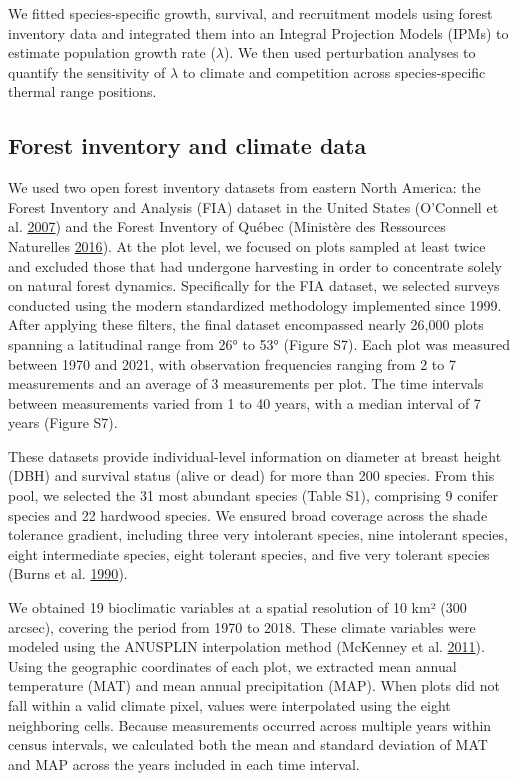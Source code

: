 \documentclass[12pt]{article}
\begin{document}
We fitted species-specific growth, survival, and recruitment models
using forest inventory data and integrated them into an Integral
Projection Models (IPMs) to estimate population growth rate
(\(\lambda\)). We then used perturbation analyses to quantify the
sensitivity of \(\lambda\) to climate and competition across
species-specific thermal range positions.

\hypertarget{forest-inventory-and-climate-data}{%
\subsection{Forest inventory and climate
data}\label{forest-inventory-and-climate-data}}

We used two open forest inventory datasets from eastern North America:
the Forest Inventory and Analysis (FIA) dataset in the United States
(O'Connell et al. \protect\hyperlink{ref-OConnell2007}{2007}) and the
Forest Inventory of Québec (Ministère des Ressources Naturelles
\protect\hyperlink{ref-Naturelles2016}{2016}). At the plot level, we
focused on plots sampled at least twice and excluded those that had
undergone harvesting in order to concentrate solely on natural forest
dynamics. Specifically for the FIA dataset, we selected surveys
conducted using the modern standardized methodology implemented since
1999. After applying these filters, the final dataset encompassed nearly
26,000 plots spanning a latitudinal range from 26° to 53° (Figure S7).
Each plot was measured between 1970 and 2021, with observation
frequencies ranging from 2 to 7 measurements and an average of 3
measurements per plot. The time intervals between measurements varied
from 1 to 40 years, with a median interval of 7 years (Figure S7).

These datasets provide individual-level information on diameter at
breast height (DBH) and survival status (alive or dead) for more than
200 species. From this pool, we selected the 31 most abundant species
(Table S1), comprising 9 conifer species and 22 hardwood species. We
ensured broad coverage across the shade tolerance gradient, including
three very intolerant species, nine intolerant species, eight
intermediate species, eight tolerant species, and five very tolerant
species (Burns et al. \protect\hyperlink{ref-burns1990silvics}{1990}).

We obtained 19 bioclimatic variables at a spatial resolution of 10 km²
(300 arcsec), covering the period from 1970 to 2018. These climate
variables were modeled using the ANUSPLIN interpolation method (McKenney
et al. \protect\hyperlink{ref-McKenney2011}{2011}). Using the geographic
coordinates of each plot, we extracted mean annual temperature (MAT) and
mean annual precipitation (MAP). When plots did not fall within a valid
climate pixel, values were interpolated using the eight neighboring
cells. Because measurements occurred across multiple years within census
intervals, we calculated both the mean and standard deviation of MAT and
MAP across the years included in each time interval.
\end{document}
